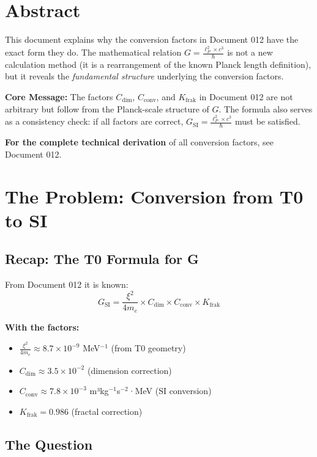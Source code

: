 \section*{Abstract}
		This document explains why the conversion factors in Document 012 have the exact form they do. The mathematical relation $G = \frac{\ell_P^2 \times c^3}{\hbar}$ is not a new calculation method (it is a rearrangement of the known Planck length definition), but it reveals the \textit{fundamental structure} underlying the conversion factors.
		
		\textbf{Core Message:} The factors $C_{\text{dim}}$, $C_{\text{conv}}$, and $K_{\text{frak}}$ in Document 012 are not arbitrary but follow from the Planck-scale structure of $G$. The formula also serves as a consistency check: if all factors are correct, $G_{\text{SI}} = \frac{\ell_P^2 \times c^3}{\hbar}$ must be satisfied.
		
		\textbf{For the complete technical derivation} of all conversion factors, see Document 012.

	
	
	\section{The Problem: Conversion from T0 to SI}
	
	\subsection{Recap: The T0 Formula for G}
	
	From Document 012 it is known:
	\begin{equation}
		G_{\text{SI}} = \frac{\xi^2}{4m_e} \times C_{\text{dim}} \times C_{\text{conv}} \times K_{\text{frak}}
	\end{equation}
	
	\textbf{With the factors:}
	\begin{itemize}
		\item $\frac{\xi^2}{4m_e} \approx 8.7 \times 10^{-9}$ MeV$^{-1}$ (from T0 geometry)
		\item $C_{\text{dim}} \approx 3.5 \times 10^{-2}$ (dimension correction)
		\item $C_{\text{conv}} \approx 7.8 \times 10^{-3}$ m³kg$^{-1}$s$^{-2}$·MeV (SI conversion)
		\item $K_{\text{frak}} = 0.986$ (fractal correction)
	\end{itemize}
	
	\subsection{The Question}
	
